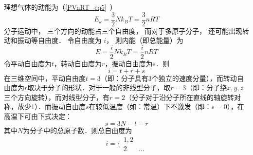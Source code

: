 
\begin{issues}
\issueDraft
\end{issues}


理想气体的动能为（\autoref{PVnRT_eq5}~）
\begin{equation}
E_k = \frac32 Nk_B T = \frac{3}{2}nRT
\end{equation}
分子运动中， 三个方向的动能占三个自由度， 而对于多原子分子， 还可能出现转动和振动等自由度． 令自由度为 $i$， 则内能（即总能量）为
\begin{equation}\label{IdgEng_eq1}
E = \frac{i}{2}Nk_B T = \frac{i}{2}nRT
\end{equation}
令平动自由度为$t$，转动自由度为$r$，振动自由度为$s$．则
\begin{equation}
i=t+r+s
\end{equation}
在三维空间中，平动自由度$t=3$（即：分子具有3个独立的速度分量），而转动自由度为$r$取决于分子的形状．对于一般的非线型分子，取$r=3$（即：分子绕$x,y,z$三个方向旋转），而对线型分子，有$r=2$（分子对于沿分子所在直线的轴旋转对称，故少1）．而振动自由度$s$在较低温度（如：常温）下不激发（即：$s=0$），在高温下可由下式决定：
\begin{equation}
s=3N-t-r
\end{equation}
其中$N$为分子中的总原子数．则总自由度为
\begin{equation}
i=\{\begin{matrix}{1,2}\\{2}&…\end{matrix}
\end{equation}
